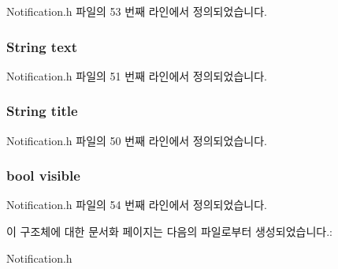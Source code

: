 Notification.\-h 파일의 53 번째 라인에서 정의되었습니다.

\hypertarget{structNotificationExtend_a685ed5195435d2b3e75433f46aec6e1e}{
\subsubsection[{text}]{\setlength{\rightskip}{0pt plus 5cm}String text}}\label{structNotificationExtend_a685ed5195435d2b3e75433f46aec6e1e}


Notification.\-h 파일의 51 번째 라인에서 정의되었습니다.

\hypertarget{structNotificationExtend_a499aeec850a240ae1aecd939c5043590}{
\subsubsection[{title}]{\setlength{\rightskip}{0pt plus 5cm}String title}}\label{structNotificationExtend_a499aeec850a240ae1aecd939c5043590}


Notification.\-h 파일의 50 번째 라인에서 정의되었습니다.

\hypertarget{structNotificationExtend_aa54a57ae048476d840caf6d4d2c47aa3}{
\subsubsection[{visible}]{\setlength{\rightskip}{0pt plus 5cm}bool visible}}\label{structNotificationExtend_aa54a57ae048476d840caf6d4d2c47aa3}


Notification.\-h 파일의 54 번째 라인에서 정의되었습니다.



이 구조체에 대한 문서화 페이지는 다음의 파일로부터 생성되었습니다.\-:\begin{DoxyCompactItemize}
\item 
Notification.\-h\end{DoxyCompactItemize}
